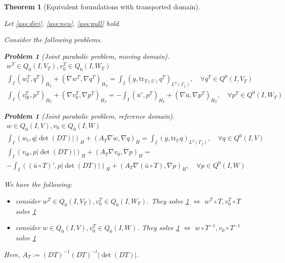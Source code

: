 \documentclass[english,a4paper,12pt,oneside]{scrbook}
\theoremstyle{break}
\newtheorem{thm}[equation]{Theorem}
\newtheorem{pb}[equation]{Problem}
\theoremstyle{remark}
\newcommand{\tr}{\text{tr}}
\begin{document}
\begin{thm}[Equivalent formulations with transported domain]
\label{thm:eq_pde}

Let \cref{ass:diri}, \cref{ass:neu}, \cref{ass:pull} hold.

Consider the following problems.

\begin{pb}[Joint parabolic problem, moving domain]
\label{pb:joint_mov}
\begin{align*}
w^T \in Q_0(I, V_T), v_0^T \in Q_0(I,W_T) \\
\int_I  (w^T_t , q^T)_{H_T}+ (\nabla w^T, \nabla q^T)_{H_T} = \int_I(g,\tr_{T(U)} q^T)_{L^2(\Gamma_f)}, \quad \forall q^T \in Q^0(I, V_T) \\
\int_I (v^T_{0t},p^T)_{H_T} + (\nabla v_0^T, \nabla p^T)_{H_T}= -\int_I(\bar{u}',p^T)_{H_T}+(\nabla \bar{u}, \nabla p^T)_{H_T}, \quad \forall p^T \in Q^0(I, W_T)
\end{align*}
\end{pb}

\begin{pb}[Joint parabolic problem, reference domain]
\label{pb:joint_ref}
\begin{align*}
w \in Q_0(I, V), v_0 \in Q_0(I,W) \\
\int_I ( w_t , q |\det(DT)|)_H+ (A_T\nabla w, \nabla q)_{H} =\int_I(g,\tr_{U} q)_{L^2(\Gamma_f)}, \quad \forall q \in Q^0(I, V) \\
\int_I ( v_{0t},p |\det(DT)|)_H + (A_T \nabla v_0, \nabla p)_{H}=\\ -\int_I((\bar{u}\circ T)',p|\det(DT)|)_{H}+(A_T \nabla (\bar{u} \circ T), \nabla p)_{H}, \quad \forall p \in Q^0(I, W)
\end{align*}
\end{pb}

We have the following:

\begin{itemize}
	\item consider $w^T \in Q_0(I, V_T), v_0^T \in Q_0(I,W_T)$. They solve \cref{pb:joint_mov} $\iff$ $w^T\circ T , v_0^T\circ T $ solve \cref{pb:joint_ref}
	\item consider $w \in Q_0(I, V), v_0^T \in Q_0(I,W)$. They solve \cref{pb:joint_ref} $\iff$ $w\circ T^{-1}, v_0\circ T^{-1}$ solve \cref{pb:joint_mov} 

\end{itemize}

Here, $A_T:=  (DT)^{-1}(DT)^{-t}|\det(DT)|$.

\end{thm}


\printbibliography[title={Bibliography}]

\end{document}
